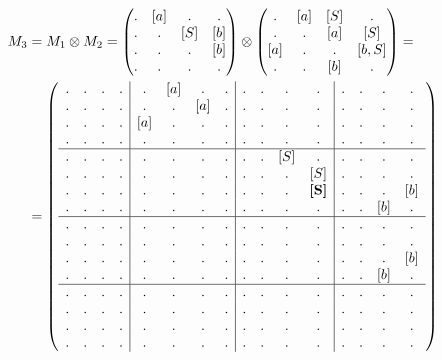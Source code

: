 \begin{example}
\begin{align}
M_3 &= M_1 \otimes M_2 = 
\begin{pmatrix} 
. & [a] & . & . \\
. & . & [S] & [b] \\
. & . & . & [b] \\
. & . & . & . 
\end{pmatrix}
\otimes 
\begin{pmatrix} 
. & [a] & [S] & . \\
. & . & [a] & [S] \\
[a] & . & . & [b,S] \\
. & . & [b] & . 
\end{pmatrix}
=\notag\\
&=
\left(\begin{array}{c c c c | c c c c | c c c c | c c c c } 
. & . & . & .  &  . & [a] & . & .  &  . & . & . & .    &  . & . & . & .   \\
. & . & . & .  &  . & . & [a] & .  &  . & . & . & .    &  . & . & . & .   \\
. & . & . & .  &  [a] & . & . & .  &  . & . & . & .    &  . & . & . & .   \\
. & . & . & .  &  . & . & . & .    &  . & . & . & .    &  . & . & . & .   \\
\hline
. & . & . & .  &  . & . & . & .    &  . & . & [S] & .             &  . & . & . & .   \\
. & . & . & .  &  . & . & . & .    &  . & . & .   & [S]           &  . & . & . & .   \\
. & . & . & .  &  . & . & . & .    &  . & . & .   & \textbf{[S]}  &  . & . & . & [b] \\
. & . & . & .  &  . & . & . & .    &  . & . & .   & .             &  . & . & [b] & . \\
\hline
. & . & . & .  &  . & . & . & .    &  . & . & . & .    &  . & . & . & .   \\
. & . & . & .  &  . & . & . & .    &  . & . & . & .    &  . & . & . & .   \\
. & . & . & .  &  . & . & . & .    &  . & . & . & .    &  . & . & . & [b] \\
. & . & . & .  &  . & . & . & .    &  . & . & . & .    &  . & . & [b] & . \\
\hline
. & . & . & .  &  . & . & . & .    &  . & . & . & .    &  . & . & . & .   \\
. & . & . & .  &  . & . & . & .    &  . & . & . & .    &  . & . & . & .   \\
. & . & . & .  &  . & . & . & .    &  . & . & . & .    &  . & . & . & .   \\
. & . & . & .  &  . & . & . & .    &  . & . & . & .    &  . & . & . & . 
\end{array}\right)
\label{eq:graph_tm}
\end{align}


\end{example}
